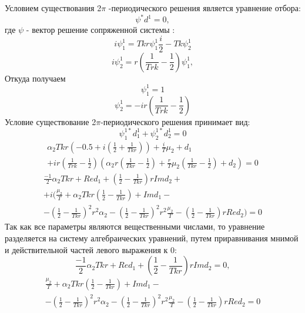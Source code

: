 \documentclass[12pt]{article}
\begin{document}
Условием существования 2$\pi$ -периодического решения является уравнение отбора:
\begin{equation*}
    \psi^* d^1 =0,
\end{equation*}
где $\psi$ - вектор решение сопряженной системы :
 \begin{equation*}
     i \psi_1^1=T k r \psi_1^1 \frac{i}{2}- T k \psi_2^1
 \end{equation*}
 \begin{equation*}
     i \psi_2^1=r \left(  \frac{1}{T r k} - \frac{1}{2}\right) \psi_1^1 ,
 \end{equation*}
 Откуда получаем
 \begin{equation*}
     \psi_1^1 =1
 \end{equation*}
 \begin{equation*}
     \psi_2^1=-i r \left(  \frac{1}{T r k} - \frac{1}{2}\right)
 \end{equation*}
Условие существование 2$\pi$-периодического решения принимает вид:
\begin{equation}
    \psi_1^{1*} d^1_1+\psi_2^{1*} d^1_2 =0
\end{equation}
\begin{multline*}
   \alpha_2 T k r \left ( -0.5+i\left(\frac{1}{2}+\frac{1}{T k r}\right) \right)+\frac{i}{T} \mu_2+d_1\\+i r \left(  \frac{1}{T r k} - \frac{1}{2}\right) \left(\alpha_2  r \left ( \frac{1}{T k r}-\frac{1}{2} \right)+\frac{r}{T} \mu_2 \left ( \frac{1}{T k r}-\frac{1}{2} \right)+d_2\right) =0
\end{multline*}
\begin{multline*}
  \frac{-1}{2} \alpha_2 T k r + Re d_1 + \left(\frac{1}{2}-\frac{1}{T k r}\right) r Im d_2+ \\+i(\frac{\mu_2}{T}+\alpha_2 T k r \left(\frac{1}{2}-\frac{1}{T k r}\right) + Im d_1-\\- \left(\frac{1}{2}-\frac{1}{T k r}\right)^2 r^2 \alpha_2-\left(\frac{1}{2}-\frac{1}{T k r}\right)^2 r^2 \frac{\mu_2}{T}-
 \left(\frac{1}{2}-\frac{1}{T k r}\right)r Re d_2 )=0
\end{multline*}
Так как все параметры являются вещественными числами, то уравнение разделяется на систему алгебраических уравнений, путем приравнивания мнимой и действительной частей левого выражения к 0:
\begin{equation*}
    \frac{-1}{2} \alpha_2 T k r + Re d_1 + \left(\frac{1}{2}-\frac{1}{T k r}\right) r Im d_2=0,
\end{equation*}
\begin{multline*}
 \frac{\mu_2}{T}+\alpha_2 T k r \left(\frac{1}{2}-\frac{1}{T k r}\right) + Im d_1-\\- \left(\frac{1}{2}-\frac{1}{T k r}\right)^2 r^2 \alpha_2-\left(\frac{1}{2}-\frac{1}{T k r}\right)^2 r^2 \frac{\mu_2}{T}-
 \left(\frac{1}{2}-\frac{1}{T k r}\right)r Re d_2 =0
\end{multline*} 
\end{document}
